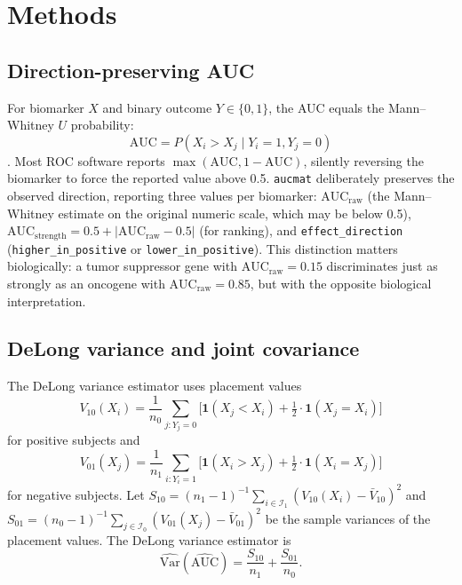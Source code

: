 \documentclass[11pt,a4paper]{article}
\begin{document}
\section{Methods}

\subsection{Direction-preserving AUC}

For biomarker $X$ and binary outcome $Y \in \{0,1\}$, the AUC equals the
Mann--Whitney $U$ probability:
\begin{equation}\label{eq:auc_mw}
\text{AUC} = P(X_i > X_j \mid Y_i = 1, Y_j = 0)
\end{equation}
\citep{Hanley1982}.  Most ROC software reports $\max(\text{AUC}, 1 -
\text{AUC})$, silently reversing the biomarker to force the reported value
above 0.5.  \texttt{aucmat} deliberately preserves the observed direction,
reporting three values per biomarker:
$\text{AUC}_{\text{raw}}$ (the Mann--Whitney estimate on the original numeric
scale, which may be below 0.5),
$\text{AUC}_{\text{strength}} = 0.5 + |\text{AUC}_{\text{raw}} - 0.5|$
(for ranking), and \texttt{effect\_direction} (\texttt{higher\_in\_positive}
or \texttt{lower\_in\_positive}).  This distinction matters biologically: a
tumor suppressor gene with $\text{AUC}_{\text{raw}} = 0.15$ discriminates
just as strongly as an oncogene with $\text{AUC}_{\text{raw}} = 0.85$, but
with the opposite biological interpretation.

\subsection{DeLong variance and joint covariance}

The DeLong variance estimator \citep{DeLong1988,Sun2014} uses placement
values
\begin{equation}\label{eq:V10}
V_{10}(X_i) = \frac{1}{n_0} \sum_{j:Y_j=0}
\bigl[\mathbf{1}(X_j < X_i) + \tfrac{1}{2} \cdot \mathbf{1}(X_j = X_i)\bigr]
\end{equation}
for positive subjects and
\begin{equation}\label{eq:V01}
V_{01}(X_j) = \frac{1}{n_1} \sum_{i:Y_i=1}
\bigl[\mathbf{1}(X_i > X_j) + \tfrac{1}{2} \cdot \mathbf{1}(X_i = X_j)\bigr]
\end{equation}
for negative subjects.  Let
$S_{10} = (n_1 - 1)^{-1} \sum_{i \in \mathcal{I}_1}
(V_{10}(X_i) - \bar{V}_{10})^2$ and
$S_{01} = (n_0 - 1)^{-1} \sum_{j \in \mathcal{I}_0}
(V_{01}(X_j) - \bar{V}_{01})^2$ be the sample variances of the placement
values.  The DeLong variance estimator is
\begin{equation}\label{eq:delong_var}
\widehat{\text{Var}}(\widehat{\text{AUC}}) = \frac{S_{10}}{n_1} +
\frac{S_{01}}{n_0}.
\end{equation}
\end{document}
